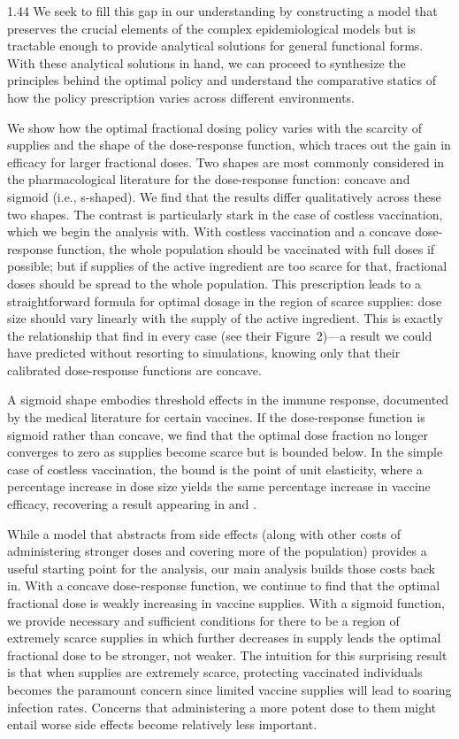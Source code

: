 \documentclass[12pt]{article}
\begin{document}
\begin{spacing}{1.44}
We seek to fill this gap in our understanding by constructing a model
that preserves the crucial elements of the complex epidemiological
models but is tractable enough to provide analytical solutions for
general functional forms. With these analytical solutions in hand, we
can proceed to synthesize the principles behind the optimal policy and
understand the comparative statics of how the policy prescription
varies across different environments.

We show how the optimal fractional dosing policy varies with the
scarcity of supplies and the shape of the dose-response function,
which traces out the gain in efficacy for larger fractional doses. Two
shapes are most commonly considered in the pharmacological literature
for the dose-response function: concave and sigmoid (i.e.,
s-shaped). We find that the results differ qualitatively across these
two shapes. The contrast is particularly stark in the case of costless
vaccination, which we begin the analysis with. With costless
vaccination and a concave dose-response function, the whole population
should be vaccinated with full doses if possible; but if supplies of
the active ingredient are too scarce for that, fractional doses should
be spread to the whole population. This prescription leads to a
straightforward formula for optimal dosage in the region of scarce
supplies: dose size should vary linearly with the supply of the active
ingredient. This is exactly the relationship that \citet{Riley2007}
find in every case (see their Figure~2)---a result we could have
predicted without resorting to simulations, knowing only that their
calibrated dose-response functions are concave.

A sigmoid shape embodies threshold effects in the immune response,
documented by the medical literature for certain vaccines.  If the
dose-response function is sigmoid rather than concave, we find that
the optimal dose fraction no longer converges to zero as supplies
become scarce but is bounded below. In the simple case of costless
vaccination, the bound is the point of unit elasticity, where a
percentage increase in dose size yields the same percentage increase
in vaccine efficacy, recovering a result appearing in
\citet{Riley2007} and \citet{Wu2016}.

While a model that abstracts from side effects (along with other costs
of administering stronger doses and covering more of the population)
provides a useful starting point for the analysis, our main analysis
builds those costs back in. With a concave dose-response function, we
continue to find that the optimal fractional dose is weakly increasing
in vaccine supplies. With a sigmoid function, we provide necessary and
sufficient conditions for there to be a region of extremely scarce
supplies in which further decreases in supply leads the optimal
fractional dose to be stronger, not weaker. The intuition for this
surprising result is that when supplies are extremely scarce,
protecting vaccinated individuals becomes the paramount concern since
limited vaccine supplies will lead to soaring infection
rates. Concerns that administering a more potent dose to them might
entail worse side effects become relatively less important.


\end{spacing}
\end{document}
